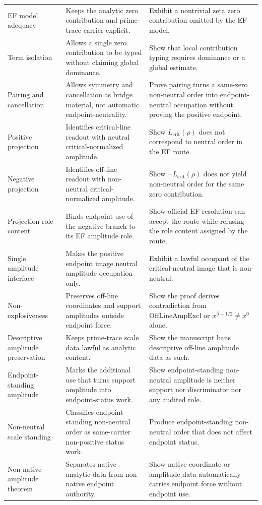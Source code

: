 \documentclass[11pt]{article}
\newcommand{\Lcrit}{L_{\mathrm{crit}}}
\newcommand{\OffAmpExcl}{\mathrm{OffLineAmpExcl}}
\begin{document}
\begin{longtable}{L{0.21\textwidth}L{0.31\textwidth}L{0.37\textwidth}}
EF model adequacy & Keeps the analytic zero contribution and prime-trace carrier explicit. & Exhibit a nontrivial zeta zero contribution omitted by the EF model.\\
Term isolation & Allows a single zero contribution to be typed without claiming global dominance. & Show that local contribution typing requires dominance or a global estimate.\\
Pairing and cancellation & Allows symmetry and cancellation as bridge material, not automatic endpoint-neutrality. & Prove pairing turns a same-zero non-neutral order into endpoint-neutral occupation without proving the positive endpoint.\\
Positive projection & Identifies critical-line readout with neutral critical-normalized amplitude. & Show \(\Lcrit(\rho)\) does not correspond to neutral order in the EF route.\\
Negative projection & Identifies off-line readout with non-neutral critical-normalized amplitude. & Show \(\neg\Lcrit(\rho)\) does not yield non-neutral order for the same zero contribution.\\
Projection-role content & Binds endpoint use of the negative branch to its EF amplitude role. & Show official EF resolution can accept the route while refusing the role content assigned by the route.\\
Single amplitude interface & Makes the positive endpoint image neutral amplitude occupation only. & Exhibit a lawful occupant of the critical-neutral image that is non-neutral.\\
Non-explosiveness & Preserves off-line coordinates and support amplitudes outside endpoint force. & Show the proof derives contradiction from \(\OffAmpExcl\) or \(x^{\beta-1/2}\ne x^0\) alone.\\
Descriptive amplitude preservation & Keeps prime-trace scale data lawful as analytic content. & Show the manuscript bans descriptive off-line amplitude data as such.\\
Endpoint-standing amplitude & Marks the additional use that turns support amplitude into endpoint-status work. & Show endpoint-standing non-neutral amplitude is neither support nor discriminator nor any audited role.\\
Non-neutral scale standing & Classifies endpoint-standing non-neutral order as same-carrier non-positive status work. & Produce endpoint-standing non-neutral order that does not affect endpoint status.\\
Non-native amplitude theorem & Separates native analytic data from non-native endpoint authority. & Show native coordinate or amplitude data automatically carries endpoint force without endpoint use.\\

\end{longtable}
\end{document}
